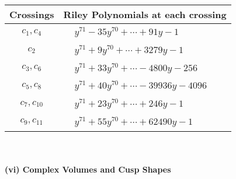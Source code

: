 \documentclass[1p]{elsarticle_modified}
\theoremstyle{definition}
\begin{document}
\begin{tabular}{m{50pt}|m{274pt}}
Crossings & \hspace{64pt}Riley Polynomials at each crossing \\
\hline $$\begin{aligned}c_{1},c_{4}\end{aligned}$$&$\begin{aligned}
&y^{71}-35 y^{70}+\cdots+91 y-1
\end{aligned}$\\
\hline $$\begin{aligned}c_{2}\end{aligned}$$&$\begin{aligned}
&y^{71}+9 y^{70}+\cdots+3279 y-1
\end{aligned}$\\
\hline $$\begin{aligned}c_{3},c_{6}\end{aligned}$$&$\begin{aligned}
&y^{71}+33 y^{70}+\cdots-4800 y-256
\end{aligned}$\\
\hline $$\begin{aligned}c_{5},c_{8}\end{aligned}$$&$\begin{aligned}
&y^{71}+40 y^{70}+\cdots-39936 y-4096
\end{aligned}$\\
\hline $$\begin{aligned}c_{7},c_{10}\end{aligned}$$&$\begin{aligned}
&y^{71}+23 y^{70}+\cdots+246 y-1
\end{aligned}$\\
\hline $$\begin{aligned}c_{9},c_{11}\end{aligned}$$&$\begin{aligned}
&y^{71}+55 y^{70}+\cdots+62490 y-1
\end{aligned}$\\
\hline
\end{tabular}\\~\\
\newpage\flushleft \textbf{(vi) Complex Volumes and Cusp Shapes}
\end{document}
